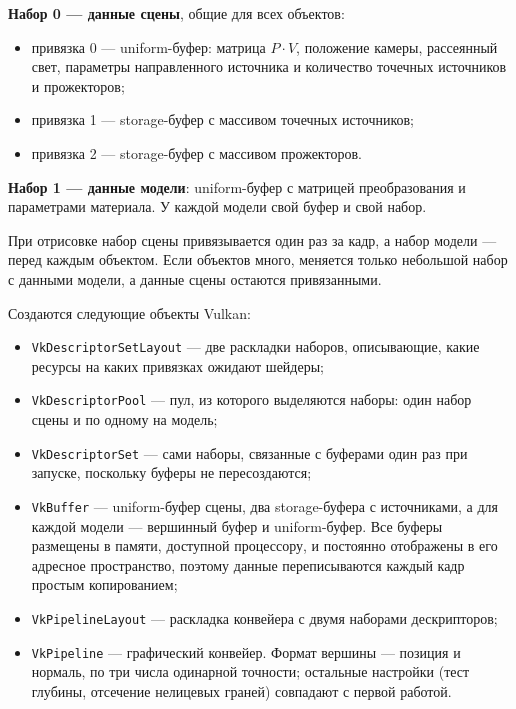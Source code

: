\documentclass[14pt,a4paper]{extarticle}
\begin{document}
\textbf{Набор 0 — данные сцены}, общие для всех объектов:

\begin{itemize}[leftmargin=*, nosep]
	\item привязка 0 — uniform-буфер: матрица $P \cdot V$, положение камеры,
	рассеянный свет, параметры направленного источника и количество
	точечных источников и прожекторов;
	\item привязка 1 — storage-буфер с массивом точечных источников;
	\item привязка 2 — storage-буфер с массивом прожекторов.
\end{itemize}

\textbf{Набор 1 — данные модели}: uniform-буфер с матрицей преобразования и
параметрами материала. У каждой модели свой буфер и свой набор.

При отрисовке набор сцены привязывается один раз за кадр, а набор модели —
перед каждым объектом. Если объектов много, меняется только небольшой набор с
данными модели, а данные сцены остаются привязанными.

Создаются следующие объекты Vulkan:

\begin{itemize}[leftmargin=*]
	\item \texttt{VkDescriptorSetLayout} — две раскладки наборов, описывающие,
	какие ресурсы на каких привязках ожидают шейдеры;

	\item \texttt{VkDescriptorPool} — пул, из которого выделяются наборы: один
	набор сцены и по одному на модель;

	\item \texttt{VkDescriptorSet} — сами наборы, связанные с буферами один раз
	при запуске, поскольку буферы не пересоздаются;

	\item \texttt{VkBuffer} — uniform-буфер сцены, два storage-буфера с
	источниками, а для каждой модели — вершинный буфер и uniform-буфер. Все
	буферы размещены в памяти, доступной процессору, и постоянно отображены в
	его адресное пространство, поэтому данные переписываются каждый кадр
	простым копированием;

	\item \texttt{VkPipelineLayout} — раскладка конвейера с двумя наборами
	дескрипторов;

	\item \texttt{VkPipeline} — графический конвейер. Формат вершины — позиция
	и нормаль, по три числа одинарной точности; остальные настройки (тест
	глубины, отсечение нелицевых граней) совпадают с первой работой.
\end{itemize}
\end{document}
